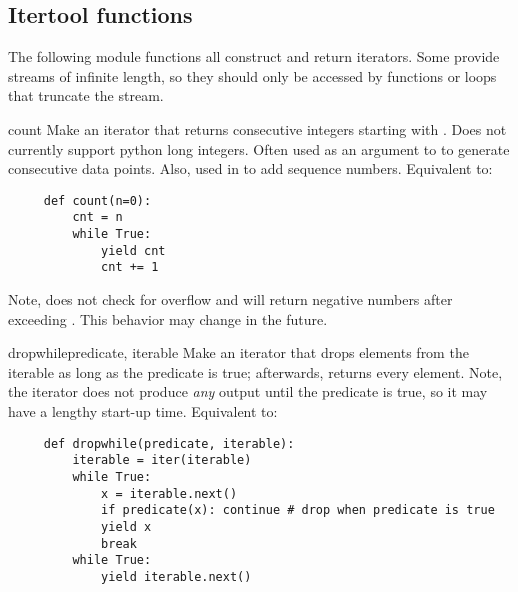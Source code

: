 \begin{seealso}

\end{seealso}


\subsection{Itertool functions \label{itertools-functions}}

The following module functions all construct and return iterators.
Some provide streams of infinite length, so they should only be accessed
by functions or loops that truncate the stream.

\begin{funcdesc}{count}{}
  Make an iterator that returns consecutive integers starting with .
  Does not currently support python long integers.  Often used as an
  argument to  to generate consecutive data points.
  Also, used in  to add sequence numbers.  Equivalent to:

  \begin{verbatim}
     def count(n=0):
         cnt = n
         while True:
             yield cnt
             cnt += 1
  \end{verbatim}

  Note,  does not check for overflow and will return
  negative numbers after exceeding .  This behavior
  may change in the future.
\end{funcdesc}

\begin{funcdesc}{dropwhile}{predicate, iterable}
  Make an iterator that drops elements from the iterable as long as
  the predicate is true; afterwards, returns every element.  Note,
  the iterator does not produce \emph{any} output until the predicate
  is true, so it may have a lengthy start-up time.  Equivalent to:

  \begin{verbatim}
     def dropwhile(predicate, iterable):
         iterable = iter(iterable)
         while True:
             x = iterable.next()
             if predicate(x): continue # drop when predicate is true
             yield x
             break
         while True:
             yield iterable.next()
  \end{verbatim}
\end{funcdesc}

